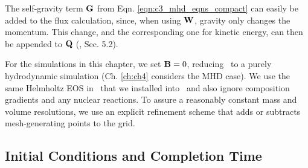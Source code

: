 
The self-gravity term ${\bf G}$ from Eqn. \ref{eqn:c3_mhd_eqns_compact} can easily be added to the flux calculation, since, when using ${\bf W}$, gravity only changes the momentum.  This change, and the corresponding one for kinetic energy, can then be appended to ${\bf Q}$ (\citealt{spri10}, Sec. 5.2).  


For the simulations in this chapter, we set ${\bf B} = 0$, reducing \arepo\ to a purely hydrodynamic simulation (Ch. \ref{ch:ch4} considers the MHD case).  We use the same Helmholtz EOS in \arepo\ that we installed into \gasoline\ and also ignore composition gradients and any nuclear reactions.  To assure a reasonably constant mass and volume resolutions, we use an explicit refinement scheme \citep{voge+12} that adds or subtracts mesh-generating points to the grid.  


\subsection{Initial Conditions and Completion Time}
\label{ssec:c3_initcond}

